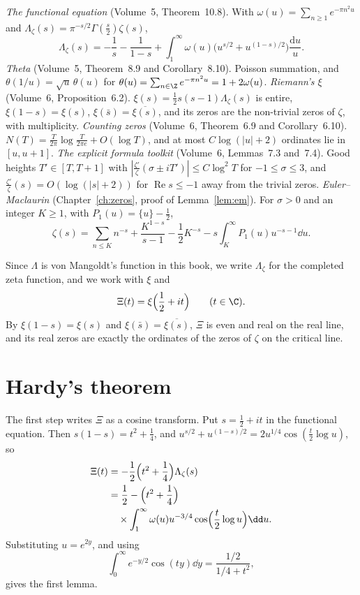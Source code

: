 \begin{reminder}
\emph{The functional equation} (Volume~5, Theorem~10.8). With $\omega(u)=\sum_{n\ge1}e^{-\pi n^2u}$ and $\Lambda_\zeta(s)=\pi^{-s/2}\Gamma(\frac s2)\zeta(s)$,
\[
\Lambda_\zeta(s)=-\frac1s-\frac1{1-s}+\int_1^\infty\omega(u)\bigl(u^{s/2}+u^{(1-s)/2}\bigr)\frac{\mathrm du}u.
\]
\emph{Theta} (Volume~5, Theorem~8.9 and Corollary~8.10). Poisson summation, and $\theta(1/u)=\sqrt u\,\theta(u)$ for $\theta(u)=\sum_{n\in\Z}e^{-\pi n^2u}=1+2\omega(u)$.
\emph{Riemann's $\xi$} (Volume~6, Proposition~6.2). $\xi(s)=\frac12s(s-1)\Lambda_\zeta(s)$ is entire, $\xi(1-s)=\xi(s)$, $\xi(\bar s)=\overline{\xi(s)}$, and its zeros are the non-trivial zeros of $\zeta$, with multiplicity.
\emph{Counting zeros} (Volume~6, Theorem~6.9 and Corollary~6.10). $N(T)=\frac T{2\pi}\log\frac T{2\pi e}+O(\log T)$, and at most $C\log(|u|+2)$ ordinates lie in $[u,u+1]$.
\emph{The explicit formula toolkit} (Volume~6, Lemmas~7.3 and~7.4). Good heights $T'\in[T,T+1]$ with $|\frac{\zeta'}\zeta(\sigma\pm iT')|\le C\log^2T$ for $-1\le\sigma\le3$, and $\frac{\zeta'}\zeta(s)=O(\log(|s|+2))$ for $\operatorname{Re}s\le-1$ away from the trivial zeros.
\emph{Euler--Maclaurin} (Chapter~\ref{ch:zeros}, proof of Lemma~\ref{lem:em}). For $\sigma>0$ and an integer $K\ge1$, with $P_1(u)=\{u\}-\frac12$,
\[
\zeta(s)=\sum_{n\le K}n^{-s}+\frac{K^{1-s}}{s-1}-\frac12K^{-s}-s\int_K^\infty P_1(u)u^{-s-1}\dd u.
\]
\end{reminder}

Since $\Lambda$ is von Mangoldt's function in this book, we write $\Lambda_\zeta$ for the completed zeta function, and we work with $\xi$ and
\[
\Xi(t)=\xi\Bigl(\frac12+it\Bigr)\qquad(t\in\C).
\]
By $\xi(1-s)=\xi(s)$ and $\xi(\bar s)=\overline{\xi(s)}$, $\Xi$ is even and real on the real line, and its real zeros are exactly the ordinates of the zeros of $\zeta$ on the critical line.

\section{Hardy's theorem}

The first step writes $\Xi$ as a cosine transform. Put $s=\frac12+it$ in the functional equation. Then $s(1-s)=t^2+\frac14$, and $u^{s/2}+u^{(1-s)/2}=2u^{1/4}\cos(\frac t2\log u)$, so
\[
\begin{aligned}\Xi(t)&=-\frac12\Bigl(t^2+\frac14\Bigr)\Lambda_\zeta(s)\\&=\frac12-\Bigl(t^2+\frac14\Bigr)\\&\quad\times\int_1^\infty\omega(u)u^{-3/4}\cos\Bigl(\frac t2\log u\Bigr)\dd u.\end{aligned}
\]
Substituting $u=e^{2y}$, and using
\[
\int_0^\infty e^{-y/2}\cos(ty)\dd y=\frac{1/2}{1/4+t^2},
\]
gives the first lemma.

